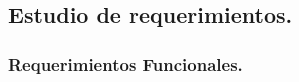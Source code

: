 \documentclass[12pt, a4paper, titlepage]{report}
\begin{document}
			
		    \subsection{Estudio de requerimientos.}
				\subsubsection{Requerimientos Funcionales.}
\end{document}
